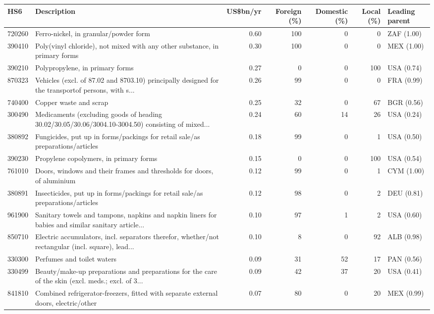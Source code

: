 \begin{tabular}{@{}l p{6.4cm} r r r r l@{}}
\toprule
HS6 & Description & US\$bn/yr & Foreign (\%) & Domestic (\%) & Local (\%) & Leading parent \\
\midrule
720260 & Ferro-nickel, in granular/\allowbreak{}powder form & 0.60 & 100 & 0 & 0 & ZAF (1.00) \\
390410 & Poly(vinyl chloride), not mixed with any other substance, in primary forms & 0.30 & 100 & 0 & 0 & MEX (1.00) \\
390210 & Polypropylene, in primary forms & 0.27 & 0 & 0 & 100 & USA (0.74) \\
870323 & Vehicles (excl. of 87.02 and 8703.10) principally designed for the transportof persons, with s... & 0.26 & 99 & 0 & 0 & FRA (0.99) \\
740400 & Copper waste and scrap & 0.25 & 32 & 0 & 67 & BGR (0.56) \\
300490 & Medicaments (excluding goods of heading 30.02/\allowbreak{}30.05/\allowbreak{}30.06/\allowbreak{}3004.10-3004.50) consisting of mixed... & 0.24 & 60 & 14 & 26 & USA (0.24) \\
380892 & Fungicides, put up in forms/\allowbreak{}packings for retail sale/\allowbreak{}as preparations/\allowbreak{}articles  & 0.18 & 99 & 0 & 1 & USA (0.50) \\
390230 & Propylene copolymers, in primary forms & 0.15 & 0 & 0 & 100 & USA (0.54) \\
761010 & Doors, windows and their frames and thresholds for doors, of aluminium & 0.12 & 99 & 0 & 1 & CYM (1.00) \\
380891 & Insecticides, put up in forms/\allowbreak{}packings for retail sale/\allowbreak{}as preparations/\allowbreak{}articles  & 0.12 & 98 & 0 & 2 & DEU (0.81) \\
961900 & Sanitary towels and tampons, napkins and napkin liners for babies and similar sanitary article... & 0.10 & 97 & 1 & 2 & USA (0.60) \\
850710 & Electric accumulators, incl. separators therefor, whether/\allowbreak{}not rectangular (incl. square), lead... & 0.10 & 8 & 0 & 92 & ALB (0.98) \\
330300 & Perfumes and toilet waters & 0.09 & 31 & 52 & 17 & PAN (0.56) \\
330499 & Beauty/\allowbreak{}make-up preparations and preparations for the care of the skin (excl. meds.; excl. of 3... & 0.09 & 42 & 37 & 20 & USA (0.41) \\
841810 & Combined refrigerator-freezers, fitted with separate external doors, electric/\allowbreak{}other & 0.07 & 80 & 0 & 20 & MEX (0.99) \\
\bottomrule
\end{tabular}
